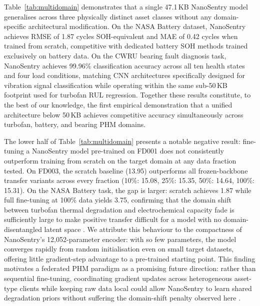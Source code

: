 \documentclass[AMA,Times1COL]{WileyNJDv5}
\begin{document}
Table~\ref{tab:multidomain} demonstrates that a single 47.1\,KB
NanoSentry model generalises across three physically distinct asset
classes without any domain-specific architectural modification.
On the NASA Battery dataset, NanoSentry achieves RMSE of 1.87 cycles
SOH-equivalent and MAE of 0.42 cycles when trained from scratch,
competitive with dedicated battery SOH methods \cite{Gong2024} trained
exclusively on battery data.
On the CWRU bearing fault diagnosis task, NanoSentry achieves
99.96\% classification accuracy across all ten health states and four
load conditions, matching CNN architectures specifically designed for
vibration signal classification \cite{Wen2018,Zhang2018} while
operating within the same sub-50\,KB footprint used for turbofan
RUL regression.
Together these results constitute, to the best of our knowledge, the
first empirical demonstration that a unified architecture below
50\,KB achieves competitive accuracy simultaneously across turbofan,
battery, and bearing PHM domains.

The lower half of Table~\ref{tab:multidomain} presents a notable
negative result: fine-tuning a NanoSentry model pre-trained on FD001
does not consistently outperform training from scratch on the target
domain at any data fraction tested.
On FD003, the scratch baseline (13.95) outperforms all frozen-backbone
transfer variants across every fraction (10\%: 15.08, 25\%: 15.35,
50\%: 14.64, 100\%: 15.31).
On the NASA Battery task, the gap is larger: scratch achieves 1.87
while full fine-tuning at 100\% data yields 3.75, confirming that
the domain shift between turbofan thermal degradation and
electrochemical capacity fade is sufficiently large to make
positive transfer difficult for a model with no domain-disentangled
latent space \cite{Almeida2026}.
We attribute this behaviour to the compactness of NanoSentry's
12{,}052-parameter encoder: with so few parameters, the model
converges rapidly from random initialisation even on small target
datasets, offering little gradient-step advantage to a pre-trained
starting point.
This finding motivates a federated PHM paradigm as a promising
future direction: rather than sequential fine-tuning, coordinating
gradient updates across heterogeneous asset-type clients while
keeping raw data local could allow NanoSentry to learn shared
degradation priors without suffering the domain-shift penalty
observed here \cite{Almeida2026}.
\end{document}

